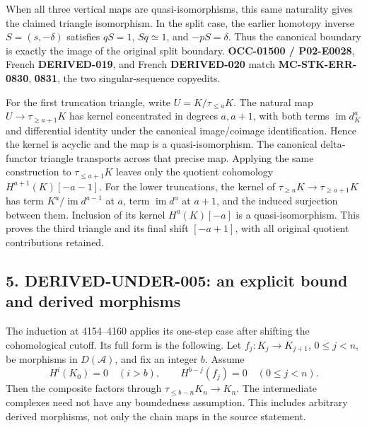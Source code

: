 \documentclass[11pt]{article}
\begin{document}
When all three vertical maps are quasi-isomorphisms,\allowbreak{} this same naturality gives the claimed triangle isomorphism. In the split case,\allowbreak{} the earlier homotopy inverse \(S=(s,-\delta)\) satisfies \(qS=1\),\allowbreak{} \(Sq\simeq1\),\allowbreak{} and \(-pS=\delta\). Thus the canonical boundary is exactly the image of the original split boundary. \textbf{OCC-01500 /\allowbreak{} P02-E0028},\allowbreak{} French \textbf{DERIVED-019},\allowbreak{} and French \textbf{DERIVED-020} match \textbf{MC-STK-ERR-0830},\allowbreak{} \textbf{0831},\allowbreak{} the two singular-sequence copyedits.

For the first truncation triangle,\allowbreak{} write \(U=K/\tau_{\leq a}K\). The natural map \(U\to\tau_{\geq a+1}K\) has kernel concentrated in degrees \(a,a+1\),\allowbreak{} with both terms \(\operatorname{im}d_K^a\) and differential identity under the canonical image/\allowbreak{}coimage identification. Hence the kernel is acyclic and the map is a quasi-isomorphism. The canonical delta-functor triangle transports across that precise map. Applying the same construction to \(\tau_{\leq a+1}K\) leaves only the quotient cohomology \(H^{a+1}(K)[-a-1]\). For the lower truncations,\allowbreak{} the kernel of \(\tau_{\geq a}K\to\tau_{\geq a+1}K\) has term \(K^a/\operatorname{im}d^{a-1}\) at \(a\),\allowbreak{} term \(\operatorname{im}d^a\) at \(a+1\),\allowbreak{} and the induced surjection between them. Inclusion of its kernel \(H^a(K)[-a]\) is a quasi-isomorphism. This proves the third triangle and its final shift \([-a+1]\),\allowbreak{} with all original quotient contributions retained.

\subsection{\texorpdfstring{5. DERIVED-UNDER-005:\allowbreak{} an explicit bound and derived morphisms}{5.  an explicit bound and derived morphisms}}\label{proofs-3487-4161-derived-under-005-an-explicit-bound-and-derived-morphisms}

The induction at 4154–\allowbreak{}4160 applies its one-step case after shifting the cohomological cutoff. Its full form is the following. Let \(f_j:K_j\to K_{j+1}\),\allowbreak{} \(0\leq j<n\),\allowbreak{} be morphisms in \(D(\mathcal A)\),\allowbreak{} and fix an integer \(b\). Assume \[
H^i(K_0)=0\quad(i>b),\qquad H^{b-j}(f_j)=0\quad(0\leq j<n).
\] Then the composite factors through \(\tau_{\leq b-n}K_n\to K_n\). The intermediate complexes need not have any boundedness assumption. This includes arbitrary derived morphisms,\allowbreak{} not only the chain maps in the source statement.
\end{document}
